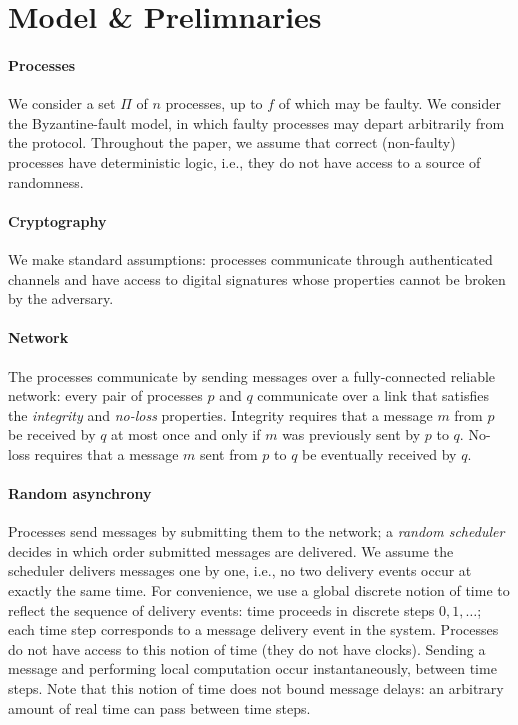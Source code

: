\section{Model \& Prelimnaries}\label{sec:model}

\paragraph{Processes} We consider a set $\Pi$ of $n$ processes, up to $f$ of which may be faulty. We consider the Byzantine-fault model, in which faulty processes may depart arbitrarily from the protocol. Throughout the paper, we assume that correct (non-faulty) processes have deterministic logic, i.e., they do not have access to a source of randomness.

\paragraph{Cryptography} We make standard assumptions: processes communicate through authenticated channels and have access to digital signatures whose properties cannot be broken by the adversary.

\paragraph{Network} The processes communicate by sending messages over a fully-connected reliable network: every pair of processes $p$ and $q$ communicate over a link that satisfies the \textit{integrity} and \textit{no-loss} properties. Integrity requires that a message $m$ from $p$ be received by $q$ at most once and only if $m$ was previously sent by $p$ to $q$. No-loss requires that a message $m$ sent from $p$ to $q$ be eventually received by $q$.

\paragraph{Random asynchrony} Processes send messages by submitting them to the network; a \textit{random scheduler} decides in which order submitted messages are delivered. We assume the scheduler delivers messages one by one, i.e., no two delivery events occur at exactly the same time. For convenience, we use a global discrete notion of time to reflect the sequence of delivery events: time proceeds in discrete steps $0, 1, \ldots$; each time step corresponds to a message delivery event in the system. Processes do not have access to this notion of time (they do not have clocks). Sending a message and performing local computation occur instantaneously, between time steps. Note that this notion of time does not bound message delays: an arbitrary amount of real time can pass between time steps.

